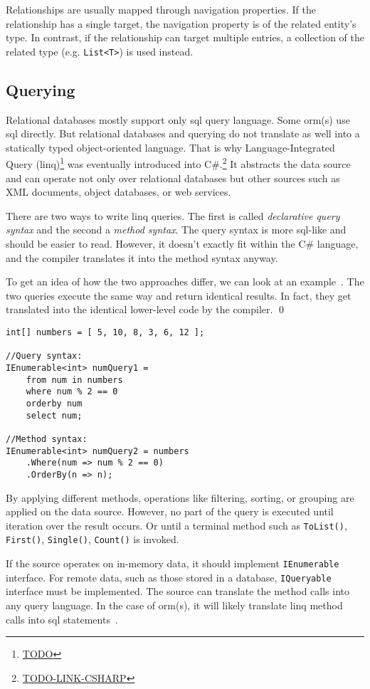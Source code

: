 Relationships are usually mapped through navigation properties. If the relationship has a single target, the navigation property is of the related entity's type. In contrast, if the relationship can target multiple entries, a collection of the related type (e.g. \texttt{List<T>}) is used instead.

\subsection{Querying}
Relational databases mostly support only \acrshort{sql} query language. Some \acrshort{orm}(s) use \acrshort{sql} directly. But relational databases and querying do not translate as well into a statically typed object-oriented language. That is why Language-Integrated Query (\acrshort{linq})\footnote{\url{TODO}} was eventually introduced into C\#.\footnote{\url{TODO-LINK-CSHARP}} It abstracts the data source and can operate not only over relational databases but other sources such as XML documents, object databases, or web services.%

There are two ways to write \acrshort{linq} queries. The first is called \textit{declarative query syntax} and the second a \textit{method syntax}. The query syntax is more \acrshort{sql}-like and should be easier to read. However, it doesn't exactly fit within the C\# language, and the compiler translates it into the method syntax anyway.

\begin{example}
\small
To get an idea of how the two approaches differ, we can look at an example~\cite{linqQueries}. The two queries execute the same way and return identical results. In fact, they get translated into the identical lower-level code by the compiler.
\qed

\begin{lstlisting}[language=CSharp]
int[] numbers = [ 5, 10, 8, 3, 6, 12 ];

//Query syntax:
IEnumerable<int> numQuery1 =
    from num in numbers
    where num % 2 == 0
    orderby num
    select num;

//Method syntax:
IEnumerable<int> numQuery2 = numbers
    .Where(num => num % 2 == 0)
    .OrderBy(n => n);
\end{lstlisting}
\end{example}

By applying different methods, operations like filtering, sorting, or grouping are applied on the data source. However, no part of the query is executed until iteration over the result occurs. Or until a terminal method such as \texttt{ToList()}, \texttt{First()}, \texttt{Single()}, \texttt{Count()} is invoked. 

If the source operates on in-memory data, it should implement \texttt{IEnumerable} interface. For remote data, such as those stored in a database, \texttt{IQueryable} interface must be implemented. The source can translate the method calls into any query language. In the case of \acrshort{orm}(s), it will likely translate \acrshort{linq} method calls into \acrshort{sql} statements~\cite{linq}.